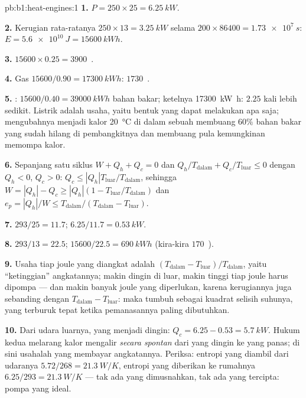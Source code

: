 \begin{solution}{pb:b1:heat-engines:1}
\textbf{1.} $P = 250 \times 25 = \qty{6.25}{kW}$.

\textbf{2.} Kerugian rata-ratanya $250 \times 13 = \qty{3.25}{kW}$ selama $200 \times 86400 =
\qty{1.73e7}{s}$: $E = \qty{5.6e10}{J} = \qty{15600}{kW h}$.

\textbf{3.} $15600 \times 0.25 = 3900$~\texteuro.

\textbf{4.} Gas $15600/0.90 = \qty{17300}{kW h}$: $1730$~\texteuro.

\textbf{5.} : $15600/0.40 = \qty{39000}{kW h}$ bahan bakar; ketelnya
\qty{17300}{kW h}: $2.25$ kali lebih sedikit. Listrik adalah usaha, yaitu bentuk yang dapat
melakukan apa saja; mengubahnya menjadi kalor \qty{20}{\degreeCelsius} di dalam sebuah 
membuang $60\%$ bahan bakar yang sudah hilang di pembangkitnya dan
membuang pula kemungkinan memompa kalor.

\textbf{6.} Sepanjang satu siklus $W + Q_h + Q_c = 0$ dan $Q_h/T_{\mathrm{dalam}} +
Q_c/T_{\mathrm{luar}} \leq 0$ dengan $Q_h < 0$, $Q_c > 0$: $Q_c \leq
|Q_h|T_{\mathrm{luar}}/T_{\mathrm{dalam}}$, sehingga $W = |Q_h| - Q_c \geq |Q_h|(1 -
T_{\mathrm{luar}}/T_{\mathrm{dalam}})$ dan $e_p = |Q_h|/W \leq T_{\mathrm{dalam}}/(T_{\mathrm{dalam}} -
T_{\mathrm{luar}})$.

\textbf{7.} $293/25 = 11.7$; $6.25/11.7 = \qty{0.53}{kW}$.

\textbf{8.} $293/13 = 22.5$; $15600/22.5 = \qty{690}{kW h}$ (kira-kira
$170$~\texteuro).

\textbf{9.} Usaha tiap joule yang diangkat adalah $(T_{\mathrm{dalam}} - T_{\mathrm{luar}})/
T_{\mathrm{dalam}}$, yaitu ``ketinggian'' angkatannya; makin dingin di luar, makin
tinggi tiap joule harus dipompa --- dan makin banyak joule yang diperlukan, karena
kerugiannya juga sebanding dengan $T_{\mathrm{dalam}} - T_{\mathrm{luar}}$: maka
 tumbuh sebagai kuadrat selisih suhunya, yang terburuk
tepat ketika pemanasannya paling dibutuhkan.

\textbf{10.} Dari udara luarnya, yang menjadi dingin: $Q_c = 6.25 - 0.53 =
\qty{5.7}{kW}$. Hukum kedua melarang kalor mengalir \emph{secara spontan}
dari yang dingin ke yang panas; di sini usahalah yang membayar angkatannya. Periksa: entropi yang diambil dari
udaranya $5.72/268 = \qty{21.3}{W/K}$, entropi yang diberikan ke rumahnya $6.25/293 =
\qty{21.3}{W/K}$ --- tak ada yang dimusnahkan, tak ada yang tercipta: pompa yang ideal.


\end{solution}
